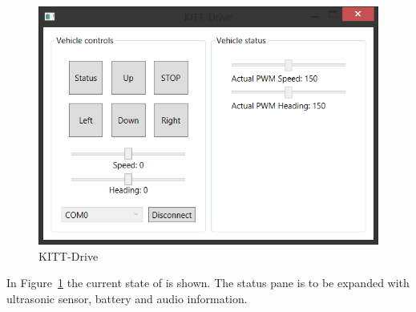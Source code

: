\documentclass[11pt,titlepage]{report}
\begin{document}
\begin{figure}[H]
	\centering
	\includegraphics[width=0.8\linewidth]{resource/KITT-Drive.png}
	\caption{KITT-Drive}
	\label{fig:ass1-kitt-drive}
\end{figure}

In Figure~\ref{fig:ass1-kitt-drive} the current state of  is shown. The status pane is to be expanded with ultrasonic sensor, battery and audio information.
\end{document}
